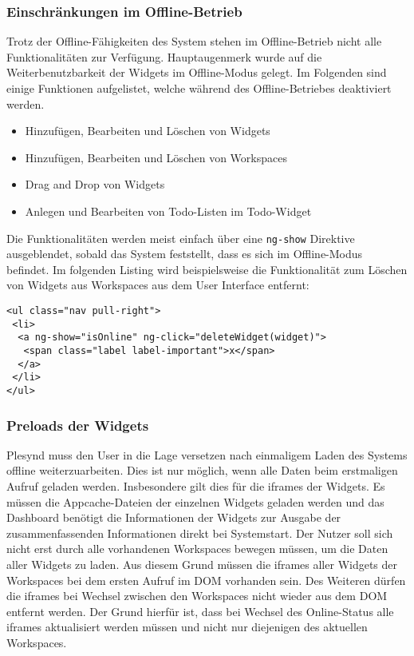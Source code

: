 \subsubsection*{Einschränkungen im Offline-Betrieb}
Trotz der Offline-Fähigkeiten des System stehen im Offline-Betrieb nicht alle Funktionalitäten zur Verfügung. Hauptaugenmerk wurde auf die Weiterbenutzbarkeit der Widgets im Offline-Modus gelegt. Im Folgenden sind einige Funktionen aufgelistet, welche während des Offline-Betriebes deaktiviert werden.
\begin{itemize}
 \item Hinzufügen, Bearbeiten und Löschen von Widgets
 \item Hinzufügen, Bearbeiten und Löschen von Workspaces
 \item Drag and Drop von Widgets
 \item Anlegen und Bearbeiten von Todo-Listen im Todo-Widget
\end{itemize}
 Die Funktionalitäten werden meist einfach über eine \texttt{ng-show} Direktive ausgeblendet, sobald das System feststellt, dass es sich im Offline-Modus befindet. Im folgenden Listing wird beispielsweise die Funktionalität zum Löschen von Widgets aus Workspaces aus dem User Interface entfernt:
\begin{lstlisting}
<ul class="nav pull-right">
 <li>
  <a ng-show="isOnline" ng-click="deleteWidget(widget)">
   <span class="label label-important">x</span>
  </a>
 </li>
</ul>
\end{lstlisting}

\subsubsection*{Preloads der Widgets}
Plesynd muss den User in die Lage versetzen nach einmaligem Laden des Systems offline weiterzuarbeiten. Dies ist nur möglich, wenn alle Daten beim erstmaligen Aufruf geladen werden. Insbesondere gilt dies für die iframes der Widgets. Es müssen die Appcache-Dateien der einzelnen Widgets geladen werden und das Dashboard benötigt die Informationen der Widgets zur Ausgabe der zusammenfassenden Informationen direkt bei Systemstart. Der Nutzer soll sich nicht erst durch alle vorhandenen Workspaces bewegen müssen, um die Daten aller Widgets zu laden. Aus diesem Grund müssen die iframes aller Widgets der Workspaces bei dem ersten Aufruf im \ac{DOM} vorhanden sein. Des Weiteren dürfen die iframes bei Wechsel zwischen den Workspaces nicht wieder aus dem \ac{DOM} entfernt werden. Der Grund hierfür ist, dass bei Wechsel des Online-Status alle iframes aktualisiert werden müssen und nicht nur diejenigen des aktuellen Workspaces.

